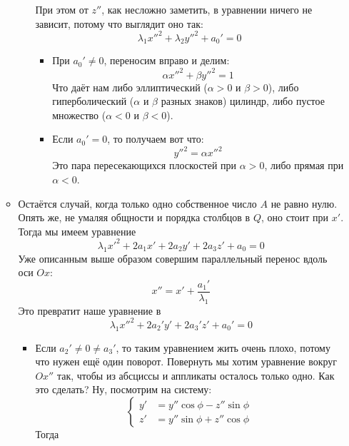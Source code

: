 \documentclass{article}
\begin{document}
\begin{itemize}
\begin{Comment}
\begin{itemize}
\begin{itemize}
$$                    $$
                    При этом от $z''$, как несложно заметить, в уравнении ничего не зависит, потому что выглядит оно так:
                    $$
                    \lambda_1{x''}^2+\lambda_2{y''}^2+a_0'=0
                    $$
                    \begin{itemize}
                        \item При $a_0'\neq0$, переносим вправо и делим:
                        $$
                        \alpha{x''}^2+\beta{y''}^2=1
                        $$
                        Что даёт нам либо эллиптический ($\alpha>0$ и $\beta>0$), либо гиперболический ($\alpha$ и $\beta$ разных знаков) цилиндр, либо пустое множество ($\alpha<0$ и $\beta<0$).
                        \item Если $a_0'=0$, то получаем вот что:
                        $$
                        {y''}^2=\alpha{x''}^2
                        $$
                        Это пара пересекающихся плоскостей при $\alpha>0$, либо прямая при $\alpha<0$.
                    \end{itemize}
                \end{itemize}
                \item Остаётся случай, когда только одно собственное число $A$ не равно нулю. Опять же, не умаляя общности и порядка столбцов в $Q$, оно стоит при $x'$. Тогда мы имеем уравнение
                $$
                \lambda_1{x'}^2+2a_1x'+2a_2y'+2a_3z'+a_0=0
                $$
                Уже описанным выше образом совершим параллельный перенос вдоль оси $Ox$:
                $$
                    x''=x'+\frac{a_1'}{\lambda_1}
                $$
                Это превратит наше уравнение в
                $$
                \lambda_1{x''}^2+2a_2'y'+2a_3'z'+a_0'=0
                $$
                \begin{itemize}
                    \item Если $a_2'\neq0\neq a_3'$, то таким уравнением жить очень плохо, потому что нужен ещё один поворот. Повернуть мы хотим уравнение вокруг $Ox''$ так, чтобы из абсциссы и аппликаты осталось только одно. Как это сделать? Ну, посмотрим на систему:
                    $$
                    \left\{\begin{aligned}
                        y'&=y''\cos\phi-z''\sin\phi\\
                        z'&=y''\sin\phi+z''\cos\phi
                    \end{aligned}\right.
                    $$
                    Тогда

\end{itemize}
\end{itemize}
\end{Comment}
\end{itemize}
\end{document}
